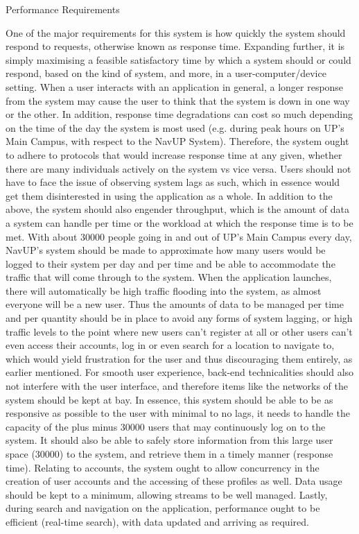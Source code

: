 Performance Requirements

One of the major requirements for this system is how quickly the system should respond to requests, otherwise known as response time. Expanding further, it is simply maximising a feasible satisfactory time by which a system should or could respond, based on the kind of system, and more, in a user-computer/device setting. 
When a user interacts with an application in general, a longer response from the system may cause the user to think that the system is down in one way or the other. In addition, response time degradations can cost so much depending on the time of the day the system is most used (e.g. during peak hours on UP’s Main Campus, with respect to the NavUP System). 
Therefore, the system ought to adhere to protocols that would increase response time at any given, whether there are many individuals actively on the system vs vice versa. Users should not have to face the issue of observing system lags as such, which in essence would get them disinterested in using the application as a whole. 
In addition to the above, the system should also engender throughput, which is the amount of data a system can handle per time or the workload at which the response time is to be met. With about 30000 people going in and out of UP’s Main Campus every day, NavUP’s system should be made to approximate how many users would  be logged to their system per day and per time and be able to accommodate the traffic that will come through to the system. 
When the application launches, there will automatically be high traffic flooding into the system, as almost everyone will be a new user. Thus the amounts of data to be managed per time and per quantity should be in place to avoid any forms of system lagging, or high traffic levels to the point where new users can’t register at all or other users can’t even access their accounts, log in or even search for a location to navigate to, which would yield frustration for the user and thus discouraging them entirely, as earlier mentioned. 
For smooth user experience, back-end technicalities should also not interfere with the user interface, and therefore items like the networks of the system should be kept at bay.
In essence, this system should be able to be as responsive as possible to the user with minimal to no lags, it needs to handle the capacity of the plus minus 30000 users that may continuously log on to the system. It should also be able to safely store information from this large user space (30000) to the system, and retrieve them in a timely manner (response time).
Relating to accounts, the system ought to allow concurrency in the creation of user accounts and the accessing of these profiles as well. Data usage should be kept to a minimum, allowing streams to be well managed. Lastly, during search and navigation on the application, performance ought to be efficient (real-time search), with data updated and arriving as required.
